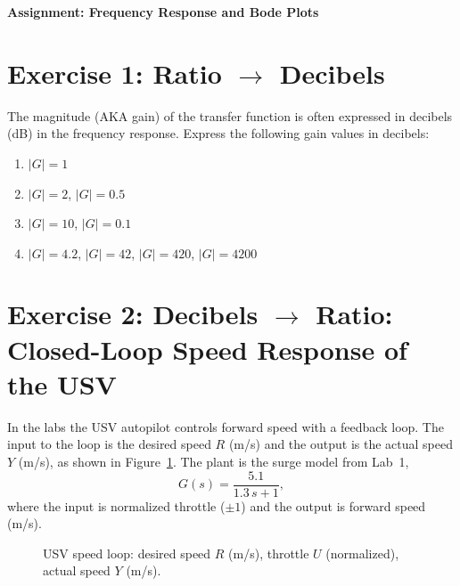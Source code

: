 \documentclass[11pt]{article}
\begin{document}
\begin{center}
  \Large{\bf{Assignment: Frequency Response and Bode Plots}}
\end{center}

\section*{Exercise 1: Ratio $\rightarrow$ Decibels}

The magnitude (AKA gain) of the transfer function is often expressed in decibels (dB) in the frequency response.  Express the following gain values in decibels:

\begin{enumerate}
\item $|G| = 1$
\item $|G| = 2$, \quad $|G| = 0.5$
\item $|G| = 10$, \quad $|G| = 0.1$
\item $|G| = 4.2$, \quad $|G| = 42$, \quad $|G| = 420$, \quad $|G| = 4200$
\end{enumerate}

\section*{Exercise 2: Decibels $\rightarrow$ Ratio: Closed-Loop Speed Response of the USV}

In the labs the USV autopilot controls forward speed with a feedback loop.  The input to the loop is the desired speed $R$ (m/s) and the output is the actual speed $Y$ (m/s), as shown in Figure~\ref{fig:speedloop}.  The plant is the surge model from Lab~1,
\[
  G(s) = \frac{5.1}{1.3\,s + 1},
\]
where the input is normalized throttle ($\pm 1$) and the output is forward speed (m/s).

\begin{figure}[h!]
  \centering
  \caption{USV speed loop: desired speed $R$ (m/s), throttle $U$ (normalized), actual speed $Y$ (m/s).}
  \label{fig:speedloop}
\end{figure}
\end{document}
